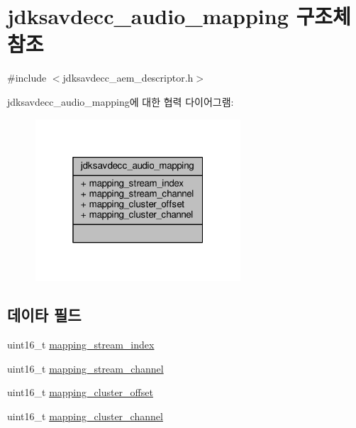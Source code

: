 \hypertarget{structjdksavdecc__audio__mapping}{}\section{jdksavdecc\+\_\+audio\+\_\+mapping 구조체 참조}
\label{structjdksavdecc__audio__mapping}


{\ttfamily \#include $<$jdksavdecc\+\_\+aem\+\_\+descriptor.\+h$>$}



jdksavdecc\+\_\+audio\+\_\+mapping에 대한 협력 다이어그램\+:
\nopagebreak
\begin{figure}[H]
\begin{center}
\leavevmode
\includegraphics[width=217pt]{structjdksavdecc__audio__mapping__coll__graph}
\end{center}
\end{figure}
\subsection*{데이타 필드}
\begin{DoxyCompactItemize}
\item 
uint16\+\_\+t \hyperlink{structjdksavdecc__audio__mapping_ae776f05f1f60f83a69c154844271ca4a}{mapping\+\_\+stream\+\_\+index}
\item 
uint16\+\_\+t \hyperlink{structjdksavdecc__audio__mapping_a82e8b562c8e2249f302ed80fc1debadf}{mapping\+\_\+stream\+\_\+channel}
\item 
uint16\+\_\+t \hyperlink{structjdksavdecc__audio__mapping_ab57e85d38dacb8e4e841cf9f1fbd7a36}{mapping\+\_\+cluster\+\_\+offset}
\item 
uint16\+\_\+t \hyperlink{structjdksavdecc__audio__mapping_af42f86d0c0e308d654bb9519455c7e26}{mapping\+\_\+cluster\+\_\+channel}
\end{DoxyCompactItemize}


